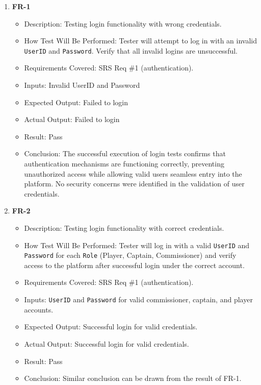 \documentclass[12pt, titlepage]{article}
\begin{document}
\begin{enumerate}
    \item \textbf{FR-1}
          \begin{itemize}
              \item Description: Testing login functionality with wrong credentials.
              \item How Test Will Be Performed: Tester will attempt to log in with an invalid \texttt{UserID} and \texttt{Password}. Verify that all invalid logins are unsuccessful.
              \item Requirements Covered: SRS Req \#1 (authentication).
              \item Inputs: Invalid UserID and Password
              \item Expected Output: Failed to login
              \item Actual Output: Failed to login
              \item Result: Pass
              \item Conclusion: The successful execution of login tests confirms that authentication mechanisms are functioning correctly,
			  preventing unauthorized access while allowing valid users seamless entry into the platform.
			  No security concerns were identified in the validation of user credentials.
          \end{itemize}

    \item \textbf{FR-2}
          \begin{itemize}
              \item Description: Testing login functionality with correct credentials.
              \item How Test Will Be Performed: Tester will log in with a valid \texttt{UserID} and \texttt{Password} for each \texttt{Role} (Player, Captain, Commissioner) and verify access to the platform after successful login under the correct account.
              \item Requirements Covered: SRS Req \#1 (authentication).
              \item Inputs: \texttt{UserID} and \texttt{Password} for valid commissioner, captain, and player accounts.
              \item Expected Output: Successful login for valid credentials.
              \item Actual Output: Successful login for valid credentials.
              \item Result: Pass
              \item Conclusion: Similar conclusion can be drawn from the result of FR-1.
          \end{itemize}


\end{enumerate}
\end{document}
